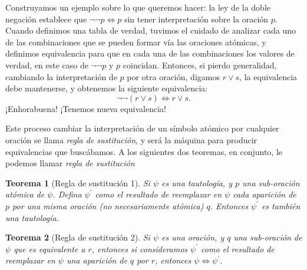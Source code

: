 \documentclass{book}
\newtheorem{thm}{Teorema}[chapter]
\begin{document}
Construyamos un ejemplo sobre lo que queremos hacer: la ley de la doble negación establece que $\neg \neg p \iff p$ sin tener interpretación sobre la oración $p$.
Cuando definimos una tabla de verdad, tuvimos el cuidado de analizar cada uno de las combinaciones que se pueden formar vía las oraciones atómicas, y definimos equivalencia para que en cada una de las combinaciones los valores de verdad, en este caso de $\neg \neg p$ y $p$ coincidan.
Entonces, si pierdo generalidad, cambiando la interpretación de $p$ por otra oración, digamos $r \vee s$, la equivalencia debe mantenerse, y obtenemos la siguiente equivalencia: \[\neg \neg (r \vee s) \iff r \vee s. \]
¡Enhorabuena! ¡Tenemos nueva equivalencia!

Este proceso cambiar la interpretación de un símbolo atómico por cualquier oración se llama \emph{regla de sustitución}, y será la máquina para producir equivalencias que buscábamos.
A los siguientes dos teoremas, en conjunto, le podemos llamar \emph{regla de sustitución}
\begin{thm}[Regla de sustitución 1]
	Si $\psi$ es una tautología, y $p$ una sub-oración atómica de $\psi$. Defina $\psi^\prime$ como el resultado de reemplazar en $\psi$ cada aparición de $p$ por una misma oración (no necesariamente atómica) $q$. Entonces $\psi^\prime$ es también una tautología.
\end{thm}
\begin{thm}[Regla de sustitución 2]
	Si $\psi$ es una oración, y $q$ una sub-oración de $\psi$ que es equivalente a $r$, entonces si consideramos $\psi^\prime$ como el resultado de reemplazar en $\psi$ una aparición de $q$ por $r$, entonces $\psi \iff \psi^\prime$.
\end{thm}
\end{document}
